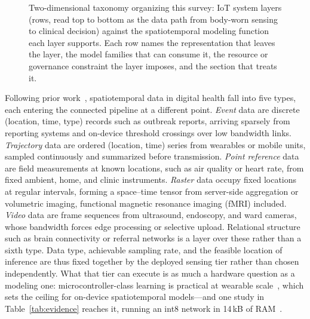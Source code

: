 \documentclass[journal]{IEEEtran}
\providecommand{\Description}[1]{}
\newif\ifsubmission
\begin{document}
\begin{figure}[t]
\caption{Two-dimensional taxonomy organizing this survey: IoT system layers (rows, read top to bottom as the data path from body-worn sensing to clinical decision) against the spatiotemporal modeling function each layer supports. Each row names the representation that leaves the layer, the model families that can consume it, the resource or governance constraint the layer imposes, and the section that treats it. }
\Description{A five-row by four-column grid. Rows are IoT system layers from sensing and device, through communication, edge gateway and cloud platform, to twin and decision. Columns give the data representation leaving each layer, the spatiotemporal model families that consume it, the constraint the layer imposes, and the section of the paper covering it.}
\label{fig:taxonomy}
\end{figure}

\ifsubmission
Following prior work~\cite{wang2022deep,atluri2018stdm}, spatiotemporal data in digital health fall into five types, each entering the connected pipeline at a different point. \emph{Event} data are discrete (location, time, type) records such as outbreak reports, arriving sparsely from reporting systems and on-device threshold crossings over low bandwidth links. \emph{Trajectory} data are ordered (location, time) series from wearables or mobile units, sampled continuously and summarized before transmission. \emph{Point reference} data are field measurements at known locations, such as air quality or heart rate, from fixed ambient, home, and clinic instruments. \emph{Raster} data occupy fixed locations at regular intervals, forming a space--time tensor from server-side aggregation or volumetric imaging, functional magnetic resonance imaging (fMRI) included. \emph{Video} data are frame sequences from ultrasound, endoscopy, and ward cameras, whose bandwidth forces edge processing or selective upload. Relational structure such as brain connectivity or referral networks is a layer over these rather than a sixth type. Data type, achievable sampling rate, and the feasible location of inference are thus fixed together by the deployed sensing tier rather than chosen independently. What that tier can execute is as much a hardware question as a modeling one: microcontroller-class learning is practical at wearable scale~\cite{saha2022mcuml}, which sets the ceiling for on-device spatiotemporal models---and one study in Table~\ref{tab:evidence} reaches it, running an int8 network in 14\,kB of RAM~\cite{verbiest2023gaitstride}.
\end{document}
